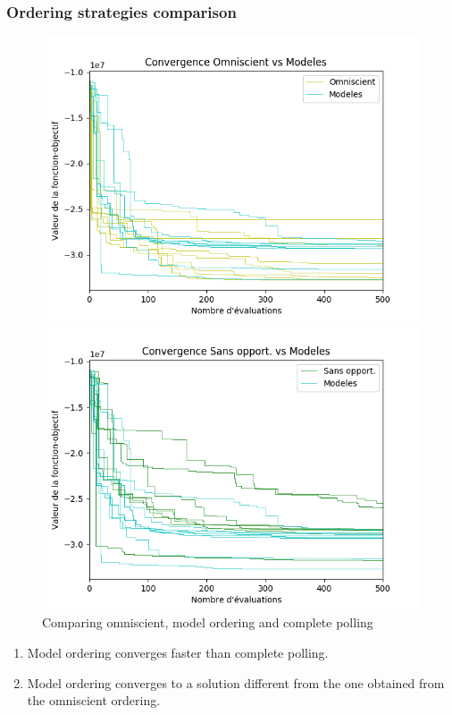 \documentclass[11pt,utf8,compress]{beamer}
\begin{document}
\begin{frame}
\frametitle{Ordering strategies comparison}
\noindent
\begin{center}
	\begin{figure}
		\vspace{-1em}
		\begin{minipage}[t]{0.5\linewidth}
			\includegraphics[width=\linewidth]{sty3.png}
		\end{minipage}%
		\hfill%
		\begin{minipage}[t]{0.5\linewidth}
			\includegraphics[width=\linewidth]{sty4.png}
		\end{minipage}
		\vspace{-1.5em}
		\caption{Comparing omniscient, model ordering and complete polling}
		\vspace{-1em}
	\end{figure}
	\begin{enumerate}
		\pause
		\item Model ordering converges faster than complete polling.
		\pause
		\item Model ordering converges to a solution different from the one obtained from the omniscient ordering.
	\end{enumerate}
\end{center}
\end{frame}
\end{document}
